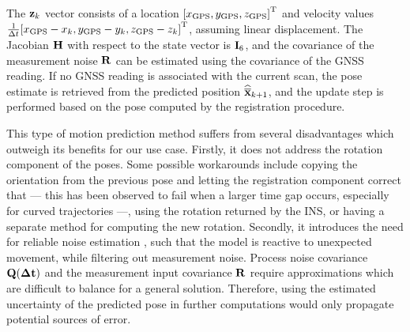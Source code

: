 The $\mathbf{z}_k$ vector consists of a location ${\left[x_\text{GPS}, y_\text{GPS}, z_\text{GPS}\right]}^\text{T}$ and velocity values $\frac{1}{\Delta t}{\left[x_\text{GPS} - x_k, y_\text{GPS} - y_k, z_\text{GPS} - z_k\right]}^\text{T}$, assuming linear displacement. The Jacobian $\mathbf{H}$ with respect to the state vector is $\mathbf{I}_6$, and the covariance of the measurement noise $\mathbf{R}$ can be estimated using the covariance of the GNSS reading. If no GNSS reading is associated with the current scan, the pose estimate is retrieved from the predicted position $\widehat{\overline{\mathbf{x}}}_{k+1}$, and the update step is performed based on the pose computed by the registration procedure.

This type of motion prediction method suffers from several disadvantages which outweigh its benefits for our use case. Firstly, it does not address the rotation component of the poses. Some possible workarounds include copying the orientation from the previous pose and letting the registration component correct that --- this has been observed to fail when a larger time gap occurs, especially for curved trajectories  ---, using the rotation returned by the INS, or having a separate method for computing the new rotation. Secondly, it introduces the need for reliable noise estimation , such that the model is reactive to unexpected movement, while filtering out measurement noise. Process noise covariance $\mathbf{Q(\Delta t)}$ and the measurement input covariance $\mathbf{R}$ require approximations which are difficult to balance for a general solution. Therefore, using the estimated uncertainty of the predicted pose in further computations would only propagate potential sources of error.

